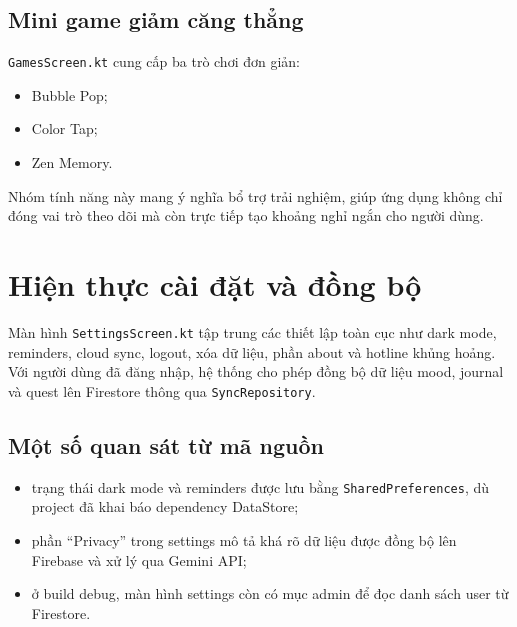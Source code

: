 \documentclass{zenbuddy-report}
\begin{document}

\subsection{Mini game giảm căng thẳng}
\texttt{GamesScreen.kt} cung cấp ba trò chơi đơn giản:
\begin{itemize}
  \item Bubble Pop;
  \item Color Tap;
  \item Zen Memory.
\end{itemize}
Nhóm tính năng này mang ý nghĩa bổ trợ trải nghiệm, giúp ứng dụng không chỉ đóng vai trò theo dõi mà còn trực tiếp tạo khoảng nghỉ ngắn cho người dùng.


\section{Hiện thực cài đặt và đồng bộ}
Màn hình \texttt{SettingsScreen.kt} tập trung các thiết lập toàn cục như dark mode, reminders, cloud sync, logout, xóa dữ liệu, phần about và hotline khủng hoảng. Với người dùng đã đăng nhập, hệ thống cho phép đồng bộ dữ liệu mood, journal và quest lên Firestore thông qua \texttt{SyncRepository}.


\subsection{Một số quan sát từ mã nguồn}
\begin{itemize}
  \item trạng thái dark mode và reminders được lưu bằng \texttt{SharedPreferences}, dù project đã khai báo dependency DataStore;
  \item phần ``Privacy'' trong settings mô tả khá rõ dữ liệu được đồng bộ lên Firebase và xử lý qua Gemini API;
  \item ở build debug, màn hình settings còn có mục admin để đọc danh sách user từ Firestore.
\end{itemize}
\end{document}
